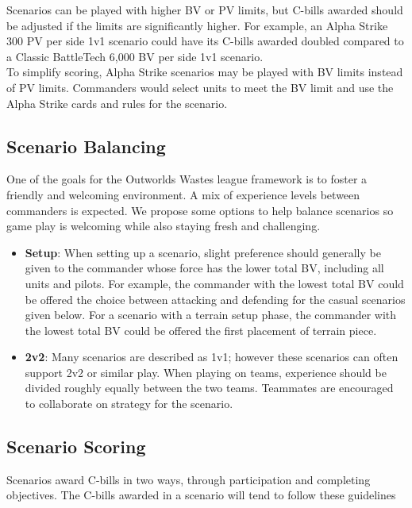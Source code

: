 \documentclass{article}
\begin{document}
Scenarios can be played with higher BV or PV limits, but C-bills awarded should be adjusted if the limits are significantly higher.
For example, an Alpha Strike 300 PV per side 1v1 scenario could have its C-bills awarded doubled compared to a Classic BattleTech 6,000 BV per side 1v1 scenario.\\

To simplify scoring, Alpha Strike scenarios may be played with BV limits instead of PV limits.
Commanders would select units to meet the BV limit and use the Alpha Strike cards and rules for the scenario.

\subsection{Scenario Balancing}

One of the goals for the Outworlds Wastes league framework is to foster a friendly and welcoming environment.
A mix of experience levels between commanders is expected.
We propose some options to help balance scenarios so game play is welcoming while also staying fresh and challenging.

\begin{itemize}

\item {\bf Setup}: When setting up a scenario, slight preference should generally be given to the commander whose force has the lower total BV, including all units and pilots.
For example, the commander with the lowest total BV could be offered the choice between attacking and defending for the casual scenarios given below.
For a scenario with a terrain setup phase, the commander with the lowest total BV could be offered the first placement of terrain piece.

\item {\bf 2v2}: Many scenarios are described as 1v1; however these scenarios can often support 2v2 or similar play.
When playing on teams, experience should be divided roughly equally between the two teams.
Teammates are encouraged to collaborate on strategy for the scenario.

\end{itemize}

\subsection{Scenario Scoring}

Scenarios award C-bills in two ways, through participation and completing objectives.
The C-bills awarded in a scenario will tend to follow these guidelines
\end{document}
